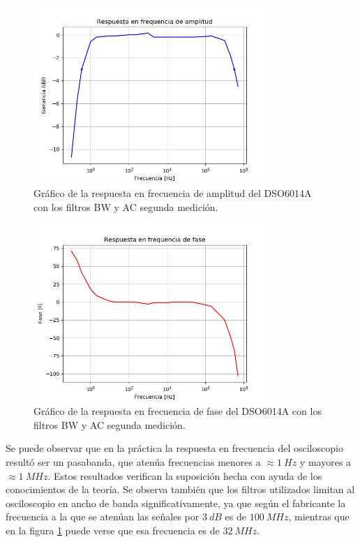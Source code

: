 \documentclass[11pt, a4paper]{article}
\begin{document}
\begin{figure}[H]
	\centering
	\includegraphics[width=0.8\textwidth]{resp_freq_osci1.png}
	\caption{Gráfico de la respuesta en frecuencia de amplitud del DSO6014A con los filtros BW y AC segunda medición.}  
	\label{graf:resp_freq_osci1}
\end{figure}

\begin{figure}[H]
	\centering
	\includegraphics[width=0.8\textwidth]{resp_freq_osci2.png}
	\caption{Gráfico de la respuesta en frecuencia de fase del DSO6014A con los filtros BW y AC segunda medición.} 
	\label{graf:resp_freq_osci2}
\end{figure}

Se puede observar que en la práctica la respuesta en frecuencia del osciloscopio resultó ser un pasabanda, que atenúa frecuencias menores a $\approx 1 \ Hz$ y mayores a $\approx 1 \ MHz$. Estos resultados verifican la suposición hecha con ayuda de los conocimientos de la teoría. Se observa también que los filtros utilizados limitan al osciloscopio en ancho de banda significativamente, ya que según el fabricante la frecuencia a la que se atenúan las señales por $3 \ dB$ es de $100 \ MHz$, mientras que en la figura \ref{graf:resp_freq_osci1} puede verse que esa frecuencia es de $32 \ MHz$.
\end{document}
